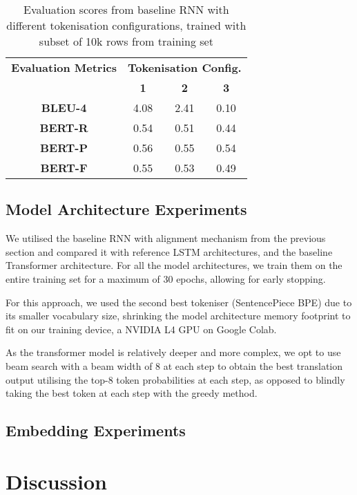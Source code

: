 \documentclass[11pt]{article}
\begin{document}
\begin{table}[h]
\begin{center}
\begin{tabular}{*4c}
\toprule
\bf Evaluation Metrics & \multicolumn{3}{c}{\bf Tokenisation Config.} \\
    & \bf 1 & \bf 2 & \bf 3 \\ 
\midrule
\bf BLEU-4 & 4.08 & 2.41 & 0.10 \\ 
\bf BERT-R & 0.54 & 0.51 & 0.44 \\
\bf BERT-P & 0.56 & 0.55 & 0.54 \\
\bf BERT-F & 0.55 & 0.53 & 0.49 \\
\bottomrule
\end{tabular}
\end{center}
\caption{
\label{tokenisation-scores} Evaluation scores 
    from baseline RNN with different 
    tokenisation configurations, trained 
    with subset of 10k rows from training set
}
\end{table}

\subsection{Model Architecture Experiments}

We utilised the baseline RNN with alignment mechanism from the previous section
and compared it with reference LSTM architectures, and the baseline Transformer
architecture. For all the model architectures, we train them on the entire
training set for a maximum of 30 epochs, allowing for early stopping. 

For this approach, we used the second best tokeniser (SentencePiece BPE) due to its
smaller vocabulary size, shrinking the model architecture memory footprint to fit on
our training device, a NVIDIA L4 GPU on Google Colab.

As the transformer model is relatively deeper and more complex, we opt to use
beam search with a beam width of 8 at each step to obtain the best translation
output utilising the top-8 token probabilities at each step, as opposed to
blindly taking the best token at each step with the greedy method.

\subsection{Embedding Experiments}



\section{Discussion}
\end{document}
